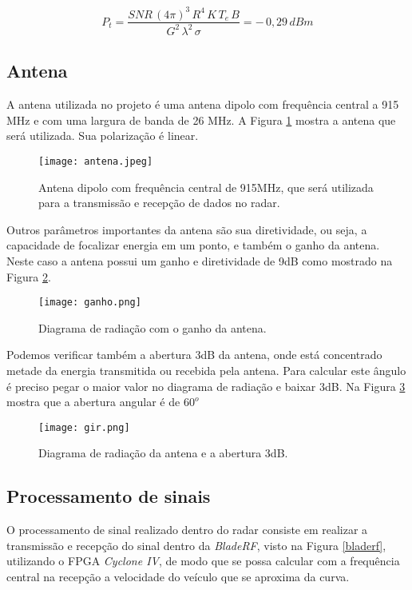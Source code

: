 \begin{equation}\label{potencia_SNR_transmitida}
    P_t = \frac{ SNR\,(4\pi)^{3}\,R^{4}\,K\,T_e\,B}{G^{2}\,   \lambda^{2}\, \sigma }  = -\,0,29\,dBm
\end{equation}

\subsection{Antena}
A antena utilizada no projeto é uma antena dipolo com frequência central a 915 MHz e com uma largura de banda de 26 MHz. A Figura \ref{antena} mostra a antena que será utilizada. Sua polarização é linear. 

\begin{figure}[H]
    \centering
   \texttt{[image: antena.jpeg]}
   \caption{Antena dipolo com frequência central de 915MHz, que será utilizada para a transmissão e recepção de dados no radar.}
   \label{antena}
    \end{figure}

Outros parâmetros importantes da antena são sua diretividade, ou seja, a capacidade de focalizar energia em um ponto, e também o ganho da antena. Neste caso a antena possui um ganho e diretividade de 9dB como mostrado na Figura \ref{ganho}.

\begin{figure}[H]
    \centering
   \texttt{[image: ganho.png]}
   \caption{Diagrama de radiação com o ganho da antena.}
   \label{ganho}
    \end{figure}

Podemos verificar também a abertura 3dB da antena, onde está concentrado metade da energia transmitida ou recebida pela antena.  Para calcular este ângulo é preciso pegar o maior valor no diagrama de radiação e baixar 3dB. Na Figura \ref{dr} mostra que a abertura angular é de $60^o$

\begin{figure}[t]
    \centering
   \texttt{[image: gir.png]}
   \caption{Diagrama de radiação da antena e a
abertura 3dB.}
   \label{dr}
    \end{figure}


\subsection{Processamento de sinais}
 
O processamento de sinal realizado dentro do radar consiste em realizar a transmissão e recepção do sinal dentro da \emph{BladeRF}, visto na Figura \ref{bladerf}, utilizando o FPGA \emph{Cyclone IV}, de modo que se possa calcular com a frequência central na recepção a velocidade do veículo que se aproxima da curva. 

